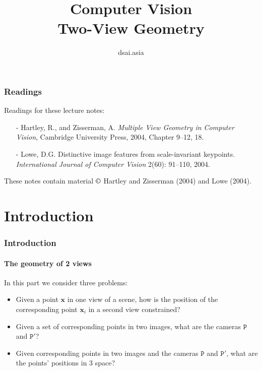 \documentclass[aspectratio=169]{beamer}
\title[Computer Vision]{Computer Vision\\Two-View Geometry}
\author{dsai.asia}
\institute[]{Asia Data Science and Artificial Intelligence Master's Program}
\date{}
\renewcommand{\vec}[1]{\boldsymbol{#1}}
\newcommand{\mat}[1]{\mathtt{#1}}
\begin{document}


\frame{\titlepage}

%

\begin{frame}
\frametitle{Readings}

Readings for these lecture notes:
\begin{itemize}
\item[-] Hartley, R., and Zisserman, A. {\em Multiple View Geometry in
    Computer Vision}, Cambridge University Press, 2004, Chapter 9--12,
  18.
\item[-] Lowe, D.G. Distinctive image features from scale-invariant
  keypoints.  {\em International Journal of Computer Vision} 2(60):
  91--110, 2004.
\end{itemize}

These notes contain material $\copyright$ Hartley and Zisserman
(2004) and Lowe (2004).

\end{frame}

\section{Introduction}

\begin{frame}
\frametitle{Introduction}
\framesubtitle{The geometry of 2 views}

In this part we consider three problems:
\begin{itemize}
\item Given a point $\vec{x}$ in one view of a scene, how is the
  position of the \alert{corresponding point} $\vec{x}_i$ in a second
  view constrained?
\item Given a set of corresponding points in two images, what are the
  \alert{cameras} $\mat{P}$ and $\mat{P}'$?
\item Given corresponding points in two images and the cameras
  $\mat{P}$ and $\mat{P}'$, what are the points' \alert{positions in 3
    space}?
\end{itemize}

\end{frame}
\end{document}
